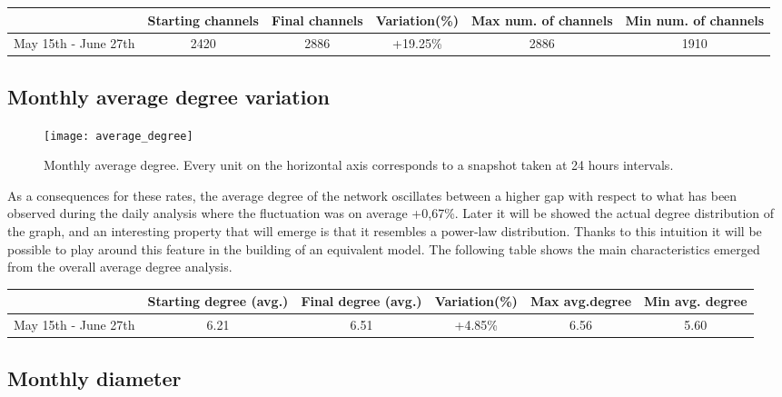 	\begin{center}
		\begin{tabulary}{\linewidth}{| L | C | C | C | C | C |}
			\hline	
			& Starting channels & Final channels  & Variation(\%) & Max num. of channels & Min num. of channels \\ \hline
			May 15th - June 27th & 2420 & 2886 & +19.25\% & 2886 & 1910 \\ \hline
		\end{tabulary}
	\end{center}
	
	\subsection{Monthly average degree variation}
	
	\begin{figure}
		\centering
		\texttt{[image: average\_degree]}
		\caption{Monthly average degree. Every unit on the horizontal axis corresponds to a snapshot taken at 24 hours intervals.}
		\label{monthly_degree}
	\end{figure}
	
	As a consequences for these rates, the average degree of the network oscillates between a higher gap with respect to what has been observed during the daily analysis where the fluctuation was on average +0,67\%. Later it will be showed the actual degree distribution of the graph, and an interesting property that will emerge is that it resembles a power-law distribution. Thanks to this intuition it will be possible to play around this feature in the building of an equivalent model. The following table shows the main characteristics emerged from the overall average degree analysis.
	
	\begin{center}
		\begin{tabulary}{\linewidth}{| L | C | C | C | C | C |}
			\hline	
			& Starting degree (avg.) & Final degree (avg.)  & Variation(\%) & Max avg.degree & Min avg. degree \\ \hline
			May 15th - June 27th & 6.21 & 6.51 & +4.85\% & 6.56 & 5.60 \\ \hline
		\end{tabulary}
	\end{center}
	
	\subsection{Monthly diameter}
	
